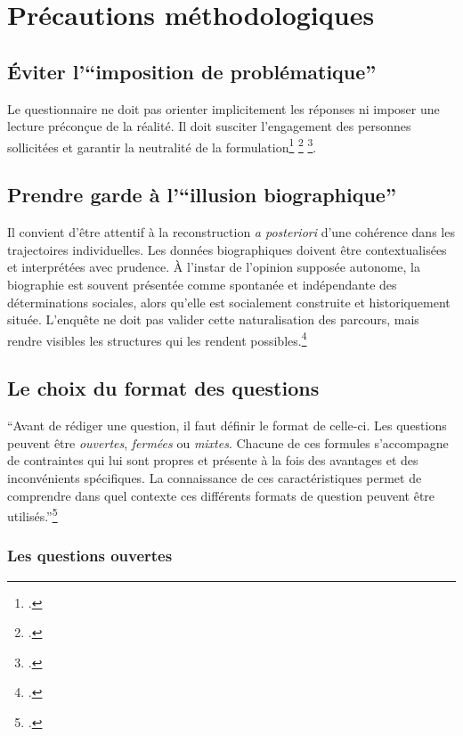 \documentclass[12pt,a4paper]{article}
\begin{document}
\section{Précautions méthodologiques}

\subsection{Éviter l'\enquote{imposition de problématique}}

Le questionnaire ne doit pas orienter implicitement les réponses ni imposer une lecture préconçue de la réalité. Il doit susciter l'engagement des personnes sollicitées et garantir la neutralité de la formulation\footcite{Bourdieu1980} \footcite[70]{DeSingly2020} \footcite[84]{Fenneteau2015}.

\subsection{Prendre garde à l'\enquote{illusion biographique}}

Il convient d'être attentif à la reconstruction \textit{a posteriori} d'une cohérence dans les trajectoires individuelles. Les données biographiques doivent être contextualisées et interprétées avec prudence. À l'instar de l'opinion supposée autonome, la biographie est souvent présentée comme spontanée et indépendante des déterminations sociales, alors qu'elle est socialement construite et historiquement située. L'enquête ne doit pas valider cette naturalisation des parcours, mais rendre visibles les structures qui les rendent possibles.\footcite[45]{Bourdieu1980}

\newpage

\subsection{Le choix du format des questions}

\enquote{Avant de rédiger une question, il faut définir le format de celle-ci.
Les questions peuvent être \textit{ouvertes}, \textit{fermées} ou \textit{mixtes}. Chacune
de ces formules s'accompagne de contraintes qui lui sont propres et
présente à la fois des avantages et des inconvénients spécifiques.
La connaissance de ces caractéristiques permet de comprendre dans
quel contexte ces différents formats de question peuvent être utilisés.}\footcite[65]{Fenneteau2015}

\subsubsection{Les questions ouvertes}
\end{document}
